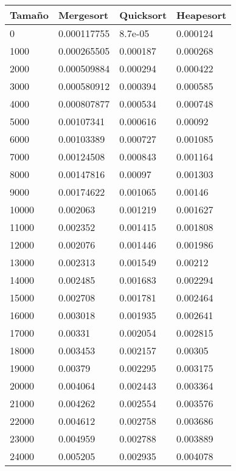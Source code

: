 \begin{tabular}[H]{|llll|}
\hline
\textbf{Tamaño} & \textbf{Mergesort} & \textbf{Quicksort} & \textbf{Heapesort} \\ \hline
0 & 0.000117755 & 8.7e-05 & 0.000124 \\ \hline
1000 & 0.000265505 & 0.000187 & 0.000268 \\ \hline
2000 & 0.000509884 & 0.000294 & 0.000422 \\ \hline
3000 & 0.000580912 & 0.000394 & 0.000585 \\ \hline
4000 & 0.000807877 & 0.000534 & 0.000748 \\ \hline
5000 & 0.00107341 & 0.000616 & 0.00092 \\ \hline
6000 & 0.00103389 & 0.000727 & 0.001085 \\ \hline
7000 & 0.00124508 & 0.000843 & 0.001164 \\ \hline
8000 & 0.00147816 & 0.00097 & 0.001303 \\ \hline
9000 & 0.00174622 & 0.001065 & 0.00146 \\ \hline
10000 & 0.002063 & 0.001219 & 0.001627 \\ \hline
11000 & 0.002352 & 0.001415 & 0.001808 \\ \hline
12000 & 0.002076 & 0.001446 & 0.001986 \\ \hline
13000 & 0.002313 & 0.001549 & 0.00212 \\ \hline
14000 & 0.002485 & 0.001683 & 0.002294 \\ \hline
15000 & 0.002708 & 0.001781 & 0.002464 \\ \hline
16000 & 0.003018 & 0.001935 & 0.002641 \\ \hline
17000 & 0.00331 & 0.002054 & 0.002815 \\ \hline
18000 & 0.003453 & 0.002157 & 0.00305 \\ \hline
19000 & 0.00379 & 0.002295 & 0.003175 \\ \hline
20000 & 0.004064 & 0.002443 & 0.003364 \\ \hline
21000 & 0.004262 & 0.002554 & 0.003576 \\ \hline
22000 & 0.004612 & 0.002758 & 0.003686 \\ \hline
23000 & 0.004959 & 0.002788 & 0.003889 \\ \hline
24000 & 0.005205 & 0.002935 & 0.004078 \\ \hline

\end{tabular}